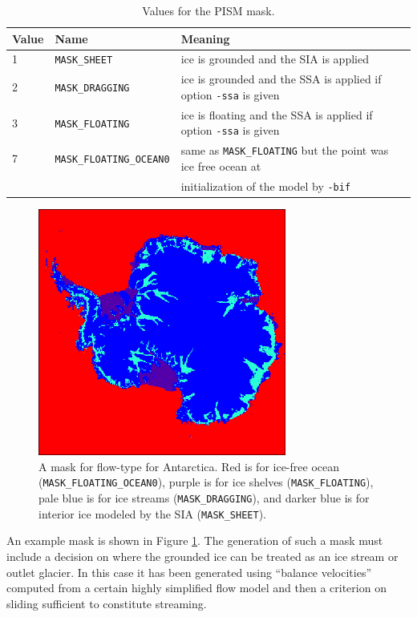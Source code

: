 \documentclass[11pt,final]{amsart}
\renewcommand{\t}[1]{\texttt{#1}}
\begin{document}
\begin{table}[ht]
\caption{Values for the PISM mask.}\label{tab:maskvals} 
\small
\begin{tabular}{@{}llll}\hline
\textbf{Value} & \textbf{Name} & \textbf{Meaning}\\ \hline
1 & \verb|MASK_SHEET| & ice is grounded and the SIA is applied \\
2 & \verb|MASK_DRAGGING| & ice is grounded and the SSA is applied if option \verb|-ssa| is given \\
3 & \verb|MASK_FLOATING| & ice is floating and the SSA is applied if option \verb|-ssa| is given \\
7 & \verb|MASK_FLOATING_OCEAN0| & same as \verb|MASK_FLOATING| but the point was ice free ocean at  \\
 & & initialization of the model by \verb|-bif|  \\
\hline\end{tabular}
\normalsize
\end{table}

\begin{figure}[ht]
\includegraphics[height=3.2in,keepaspectratio=true]{figs/ant_mask}
\caption{A mask for flow-type for Antarctica.  Red is for ice-free ocean (\t{MASK\_FLOATING\_OCEAN0}), purple is for ice shelves (\t{MASK\_FLOATING}), pale blue is for ice streams (\t{MASK\_DRAGGING}), and darker blue is for interior ice modeled by the SIA (\t{MASK\_SHEET}).}
\label{fig:ant_mask}
\end{figure}

An example mask is shown in Figure \ref{fig:ant_mask}.  The generation of such a mask must include a decision on where the grounded ice can be treated as an ice stream or outlet glacier.  In this case it has been generated using ``balance velocities'' computed from a certain highly simplified flow model \cite{BamberVaughanJoughin} and then a criterion on sliding sufficient to constitute streaming.
\end{document}
